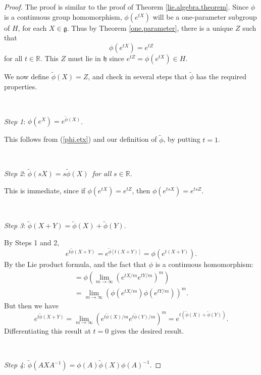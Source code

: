 \documentclass[12pt]{amsbook}
\let \frak = \mathfrak
\theoremstyle{plain}
\numberwithin{equation}{chapter}
\numberwithin{theorem}{chapter}
\begin{document}
\begin{proof}
The proof is similar to the proof of Theorem \ref{lie.algebra.theorem}. Since
$\phi$ is a continuous group homomorphism, $\phi(e^{tX})$ will be a
one-parameter subgroup of $H$, for each $X\in\frak{g}$. Thus by Theorem
\ref{one.parameter}, there is a unique $Z$ such that
\begin{equation}
\phi\left(  e^{tX}\right)  =e^{tZ}\label{phi.etx}%
\end{equation}
for all $t\in\mathbb{R}$. This $Z$ must lie in $\frak{h}$ since $e^{tZ}%
=\phi\left(  e^{tX}\right)  \in H$.

We now define $\widetilde{\phi}(X)=Z$, and check in several steps that
$\widetilde{\phi}$ has the required properties.

\ 

\textit{Step 1}: $\phi(e^{X})=e^{\widetilde{\phi}(X)}$.

This follows from (\ref{phi.etx}) and our definition of $\widetilde{\phi}$, by
putting $t=1$.

\ 

\textit{Step 2}: $\widetilde{\phi}(sX)=s\widetilde{\phi}(X)$\textit{\ for all
}$s\in\mathbb{R}$.

This is immediate, since if $\phi(e^{tX})=e^{tZ}$, then $\phi(e^{tsX}%
)=e^{tsZ}$.

\ 

\textit{Step 3}: $\widetilde{\phi}(X+Y)=\widetilde{\phi}(X)+\widetilde{\phi
}(Y)$.

By Steps 1 and 2,
\[
e^{t\widetilde{\phi}(X+Y)}=e^{\widetilde{\phi}[t(X+Y)]}=\phi\left(
e^{t(X+Y)}\right)  \text{.}%
\]
By the Lie product formula, and the fact that $\phi$ is a continuous
homomorphism:
\begin{align*}
=\phi\left(  \lim_{m\rightarrow\infty}\left(  e^{tX/m}e^{tY/m}\right)
^{m}\right)  \\
=\lim_{m\rightarrow\infty}\left(  \phi\left(  e^{tX/m}\right)  \phi
(e^{tY/m})\right)  ^{m}\text{.}%
\end{align*}
But then we have
\[
e^{t\widetilde{\phi}(X+Y)}=\lim_{m\rightarrow\infty}\left(  e^{t\widetilde
{\phi}(X)/m}e^{t\widetilde{\phi}(Y)/m}\right)  ^{m}=e^{t\left(  \widetilde
{\phi}(X)+\widetilde{\phi}(Y)\right)  }\text{.}%
\]
Differentiating this result at $t=0$ gives the desired result.

\ \ 

\textit{Step 4}: $\widetilde{\phi}\left(  AXA^{-1}\right)  =\phi
(A)\widetilde{\phi}(X)\phi(A)^{-1}$.


\end{proof}
\end{document}
